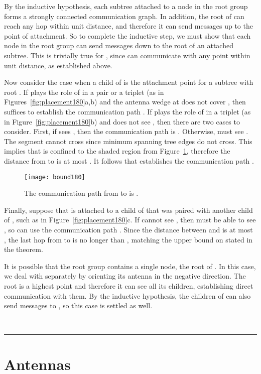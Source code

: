 \documentclass[11pt]{article}
\newcommand{\qed}{\rule{0.5em}{1.5ex}}
\newcommand{\fqed}{{\hfill~\qed}}
\newenvironment{proof}{{\noindent \bf Proof.}}
                      {{\hfill \fqed} \vspace{1em}}
\begin{document}
\begin{proof}
By the inductive hypothesis, each subtree 
attached to a node in the root group forms a strongly connected
communication graph. In addition, the root of  can reach any
hop within unit distance, and therefore it can send messages up to
the point of attachment. So to complete the inductive step, we
must show that each node in the root group can send messages down
to the root of an attached subtree. This is trivially true for , since  can communicate with any
point within unit distance, as established above.

Now consider the case when a child  of  is the attachment point
for a subtree with root .  If  plays the role of  in a
pair or a triplet (as in Figures~\ref{fig:placement180}a,b) and
the antenna wedge at  does not cover , then 
suffices to establish the communication path .
If  plays the role of  in a triplet (as in Figure~\ref{fig:placement180}b)
and  does not see , then there are two cases to
consider. First, if  sees , then the communication path is
. Otherwise,  must see .
The segment  cannot cross  since minimum spanning tree
edges do not cross.
This implies that  is confined to the shaded region from Figure~\ref{fig:bound180},
therefore the distance from  to  is at most . It follows that
 establishes the communication path .

\begin{figure}[htpb]
\centering
\texttt{[image: bound180]}
\caption{The communication path from  to  is .}
\label{fig:bound180}
\end{figure}

Finally, suppose that  is attached to a child of  that was
paired with another child of , such as  in
Figure~\ref{fig:placement180}c. If  cannot see ,
then  must be able to see , so  can use the communication path
. Since the distance between  and 
is at most , the last hop from  to  is no
longer than , matching the upper bound on 
stated in the theorem.

It is possible that the root group contains a single node,
the root  of . In this case, we deal
with  separately by orienting its antenna in the negative  direction.
The root is a highest point and therefore it can see all its
children, establishing direct communication with them.
By the inductive hypothesis, the children of  can also send
messages to , so this case is settled as well.
\end{proof}

\section{Antennas}
\label{sec:90}
\end{document}
